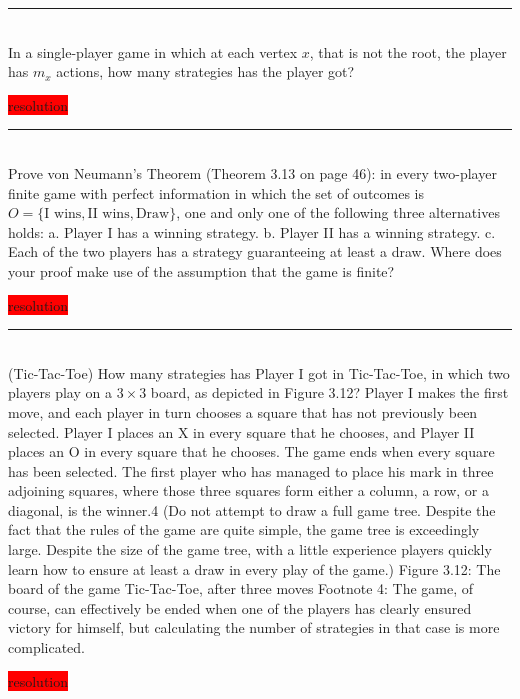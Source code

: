 \documentclass[10pt]{report}
\newenvironment{exercise}[1]
    {\vspace{0.5cm}\hrule\vspace{0.5cm}\noindent\fbox{#1}\\}
    {\vspace{0.5cm}}
\newenvironment{response}
{\vspace{0.2cm}\noindent\colorbox{red}{resolution}}
    {\vspace{0.5cm}}
\begin{document}
\begin{exercise}{3.6}
	In a single-player game in which at each vertex $x$, that is not the root, the player has $m_x$ actions, how many strategies has the player got?

	\begin{response}

	\end{response}
\end{exercise}

\begin{exercise}{3.7}
	Prove von Neumann’s Theorem (Theorem 3.13 on page 46): in every two-player finite game with perfect information in which the set of outcomes is $O = \{\text{I wins}, \text{II wins}, \text{Draw}\}$, one and only one of the following three alternatives holds:
	a. Player I has a winning strategy.
	b. Player II has a winning strategy.
	c. Each of the two players has a strategy guaranteeing at least a draw.
	Where does your proof make use of the assumption that the game is finite?

	\begin{response}
	\end{response}
\end{exercise}

\begin{exercise}{3.8}
	(Tic-Tac-Toe) How many strategies has Player I got in Tic-Tac-Toe, in which two players play on a $3\times 3$ board, as depicted in Figure 3.12? Player I makes the first move, and each player in turn chooses a square that has not previously been selected. Player I places an X in every square that he chooses, and Player II places an O in every square that he chooses. The game ends when every square has been selected. The first player who has managed to place his mark in three adjoining squares, where those three squares form either a column, a row, or a diagonal, is the winner.4 (Do not attempt to draw a full game tree. Despite the fact that the rules of the game are quite simple, the game tree is exceedingly large. Despite the size of the game tree, with a little experience players quickly learn how to ensure at least a draw in every play of the game.)
	Figure 3.12: The board of the game Tic-Tac-Toe, after three moves
	Footnote 4: The game, of course, can effectively be ended when one of the players has clearly ensured victory for himself, but calculating the number of strategies in that case is more complicated.

	\begin{response}
	\end{response}
\end{exercise}
\end{document}
